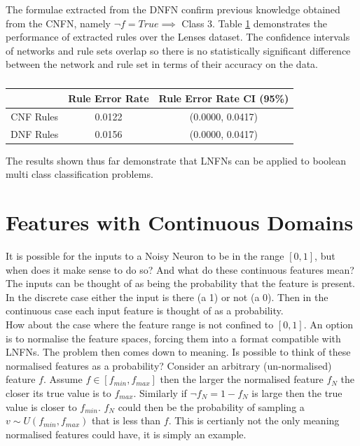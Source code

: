 The formulae extracted from the DNFN confirm previous knowledge obtained from the CNFN, namely $\lnot f = True \implies $ Class 3. Table \ref{tab:lenses-rule-peformance-comp} demonstrates the performance of extracted rules over the Lenses dataset. The confidence intervals of networks and rule sets overlap so there is no statistically significant difference between the network and rule set in terms of their accuracy on the data.

\begin{table}[H]
	\begin{center}
		\begin{tabular}{| c | c | c |}
			\hline
			& Rule Error Rate & Rule Error Rate CI (95\%) \\
			\hline
			\hline
			CNF Rules & 0.0122 & (0.0000, 0.0417) \\
			\hline
			DNF Rules & 0.0156 & (0.0000, 0.0417) \\
			\hline
		\end{tabular}
	\end{center}
	\caption{}
	\label{tab:lenses-rule-peformance-comp}
\end{table}

The results shown thus far demonstrate that LNFNs can be applied to boolean multi class classification problems.

\section{Features with Continuous Domains}
It is possible for the inputs to a Noisy Neuron to be in the range $[0,1]$, but when does it make sense to do so? And what do these continuous features mean? The inputs can be thought of as being the probability that the feature is present. In the discrete case either the input is there (a 1) or not (a 0). Then in the continuous case each input feature is thought of as a probability.\\

How about the case where the feature range is not confined to $[0,1]$. An option is to normalise the feature spaces, forcing them into a format compatible with LNFNs. The problem then comes down to meaning. Is possible to think of these normalised features as a probability? Consider an arbitrary (un-normalised) feature $f$. Assume $f \in [f_{min}, f_{max}]$ then the larger the normalised feature $f_N$ the closer its true value is to $f_{max}$. Similarly if $\lnot f_N = 1 - f_N$ is large then the true value is closer to $f_{min}$. $f_N$ could then be the probability of sampling a $v \sim U(f_{min}, f_{max})$ that is less than $f$. This is certianly not the only meaning normalised features could have, it is simply an example.\\

